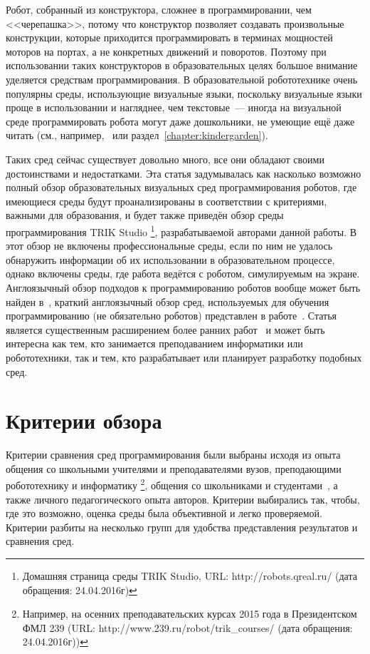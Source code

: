 \documentclass[a5paper]{article}
\begin{document}
Робот, собранный из конструктора, сложнее в программировании, чем <<черепашка>>, потому что конструктор позволяет 
создавать произвольные конструкции, которые приходится программировать в терминах мощностей моторов на портах, 
а не конкретных движений и поворотов. Поэтому при использовании таких конструкторов в образовательных целях 
большое внимание уделяется средствам программирования. В образовательной робототехнике очень популярны 
среды, использующие визуальные языки, поскольку визуальные языки проще в использовании и нагляднее, чем 
текстовые~--- иногда на визуальной среде программировать робота могут даже дошкольники, не умеющие ещё 
даже читать (см., например,~\cite{portsmore1999robolab} или раздел~\ref{chapter:kindergarden}).

Таких сред сейчас существует довольно много, все они обладают своими достоинствами и недостатками. Эта статья 
задумывалась как насколько возможно полный обзор образовательных визуальных сред программирования роботов, 
где имеющиеся среды будут проанализированы в соответствии с критериями, важными для образования, и будет 
также приведён обзор среды программирования TRIK Studio%
\footnote{Домашняя страница среды TRIK Studio, URL: http://robots.qreal.ru/ (дата обращения: 24.04.2016г)}, 
разрабатываемой авторами данной работы. В этот обзор не включены профессиональные среды, если по ним не удалось обнаружить информации об их 
использовании в образовательном процессе, однако включены среды, где работа ведётся с роботом, симулируемым 
на экране. Англоязычный обзор подходов к программированию роботов вообще может быть найден в~\cite{biggs2003survey}, 
краткий англоязычный обзор сред, используемых для обучения программированию (не обязательно роботов) представлен в работе~\cite{powers2006tools}.
Статья является существенным расширением более ранних работ~\cite{litvinov2013robots,litvinov2012robots} и
может быть интересна как тем, кто занимается преподаванием информатики или робототехники, 
так и тем, кто разрабатывает или планирует разработку подобных сред.

\section{Критерии обзора}
\label{chapter:criterion}

Критерии сравнения сред программирования были выбраны исходя из опыта общения со школьными учителями и 
преподавателями вузов, преподающими робототехнику и информатику%
\footnote{Например, на осенних преподавательских курсах 2015 года в Президентском ФМЛ 239 (URL: http://www.239.ru/robot/trik\_courses/ (дата обращения: 24.04.2016г))}, 
общения со школьниками и студентами~\cite{sokovikova2012qrealrobots}, 
а также личного педагогического опыта авторов. Критерии выбирались так, чтобы, где это возможно, оценка 
среды была объективной и легко проверяемой. Критерии разбиты на несколько групп для удобства представления результатов 
и сравнения сред.
\end{document}
